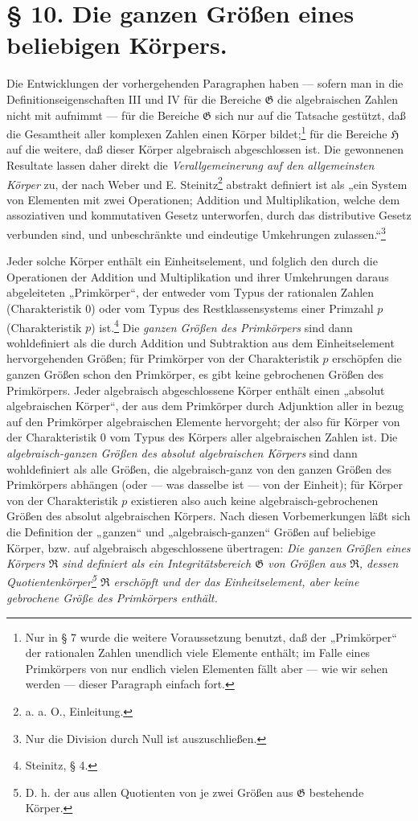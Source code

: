 \documentclass[11pt]{article}
\begin{document}
\section*{§ 10. Die ganzen Größen eines beliebigen Körpers.}

Die Entwicklungen der vorhergehenden Paragraphen haben --- sofern man in die
Definitionseigenschaften III und IV für die Bereiche $\mathfrak G$ die
algebraischen Zahlen nicht mit aufnimmt --- für die Bereiche $\mathfrak G$ sich
nur auf die Tatsache gestützt, daß die Gesamtheit aller komplexen Zahlen einen
Körper bildet;\footnote{Nur in § 7 wurde die weitere Voraussetzung benutzt, daß
der „Primkörper“ der rationalen Zahlen unendlich viele Elemente enthält; im Falle
eines Primkörpers von nur endlich vielen Elementen fällt aber --- wie wir sehen
werden --- dieser Paragraph einfach fort.} für die Bereiche $\mathfrak H$ auf
die weitere, daß dieser Körper algebraisch abgeschlossen ist. Die gewonnenen
Resultate lassen daher direkt die \emph{Verallgemeinerung auf den allgemeinsten
Körper} zu, der nach Weber und E. Steinitz\footnote{a. a. O., Einleitung.}
abstrakt definiert ist als „ein System von Elementen mit zwei Operationen;
Addition und Multiplikation, welche dem assoziativen und kommutativen Gesetz
unterworfen, durch das distributive Gesetz verbunden sind, und unbeschränkte und
eindeutige Umkehrungen zulassen.“\footnote{Nur die Division durch Null ist
auszuschließen.}

Jeder solche Körper enthält ein Einheitselement, und folglich den durch die
Operationen der Addition und Multiplikation und ihrer Umkehrungen daraus
abgeleiteten „Primkörper“, der entweder vom Typus der rationalen Zahlen
(Charakteristik 0) oder vom Typus des Restklassensystems einer Primzahl $p$
(Charakteristik $p$) ist.\footnote{Steinitz, § 4.} Die \emph{ganzen Größen des
Primkörpers} sind dann wohldefiniert als die durch Addition und Subtraktion aus
dem Einheitselement hervorgehenden Größen; für Primkörper von der
Charakteristik $p$ erschöpfen die ganzen Größen schon den Primkörper, es gibt
keine gebrochenen Größen des Primkörpers. Jeder algebraisch abgeschlossene
Körper enthält einen „absolut algebraischen Körper“, der aus dem Primkörper
durch Adjunktion aller in bezug auf den Primkörper algebraischen Elemente
hervorgeht; der also für Körper von der Charakteristik 0 vom Typus des Körpers
aller algebraischen Zahlen ist. Die \emph{algebraisch-ganzen Größen des absolut
algebraischen Körpers} sind dann wohldefiniert als alle Größen, die
algebraisch-ganz von den ganzen Größen des Primkörpers abhängen (oder --- was
dasselbe ist --- von der Einheit); für Körper von der Charakteristik $p$
existieren also auch keine algebraisch-gebrochenen Größen des absolut
algebraischen Körpers. Nach diesen Vorbemerkungen läßt sich die Definition der
„ganzen“ und „algebraisch-ganzen“ Größen auf beliebige Körper, bzw. auf
algebraisch abgeschlossene übertragen: \emph{Die ganzen Größen eines Körpers
$\mathfrak R$ sind definiert als ein Integritätsbereich $\mathfrak G$ von Größen
aus $\mathfrak R$, dessen Quotientenkörper\footnote{D. h. der aus allen
Quotienten von je zwei Größen aus $\mathfrak G$ bestehende Körper.}
$\mathfrak R$ erschöpft und der das Einheitselement, aber keine gebrochene Größe
des Primkörpers enthält.}
\end{document}
